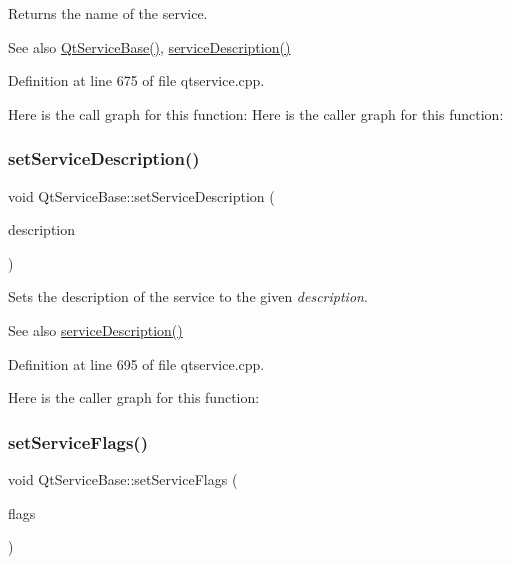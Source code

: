 Returns the name of the service.

\begin{DoxySeeAlso}{See also}
\mbox{\hyperlink{class_qt_service_base_a75e3f82739df6dc0b9aa899b3f9552eb}{Qt\+Service\+Base()}}, \mbox{\hyperlink{class_qt_service_base_a6cf3ef7bc5d85acb31e99a85fde47397}{service\+Description()}} 
\end{DoxySeeAlso}


Definition at line 675 of file qtservice.\+cpp.

Here is the call graph for this function\+:
Here is the caller graph for this function\+:
\mbox{\label{class_qt_service_base_a09d7547436c65a900f18c58b2a650286}} 
\subsubsection{\texorpdfstring{set\+Service\+Description()}{setServiceDescription()}}
{\footnotesize\ttfamily void Qt\+Service\+Base\+::set\+Service\+Description (\begin{DoxyParamCaption}\item[{const Q\+String \&}]{description }\end{DoxyParamCaption})}

Sets the description of the service to the given {\itshape description}.

\begin{DoxySeeAlso}{See also}
\mbox{\hyperlink{class_qt_service_base_a6cf3ef7bc5d85acb31e99a85fde47397}{service\+Description()}} 
\end{DoxySeeAlso}


Definition at line 695 of file qtservice.\+cpp.

Here is the caller graph for this function\+:
\mbox{\label{class_qt_service_base_a3f8a07d0cf536720e7fcf1ec562635d1}} 
\subsubsection{\texorpdfstring{set\+Service\+Flags()}{setServiceFlags()}}
{\footnotesize\ttfamily void Qt\+Service\+Base\+::set\+Service\+Flags (\begin{DoxyParamCaption}\item[{Service\+Flags}]{flags }\end{DoxyParamCaption})}


